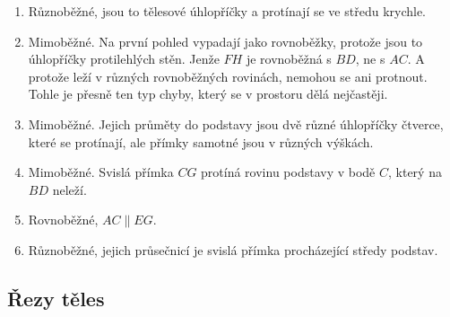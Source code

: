 \begin{solution}
  \begin{enumerate}[label=(\alph*)]
    \item Různoběžné, jsou to tělesové úhlopříčky a protínají se ve středu krychle.
    \item Mimoběžné. Na první pohled vypadají jako rovnoběžky, protože jsou to úhlopříčky protilehlých stěn. Jenže $FH$ je rovnoběžná s $BD$, ne s $AC$. A protože leží v různých rovnoběžných rovinách, nemohou se ani protnout. Tohle je přesně ten typ chyby, který se v prostoru dělá nejčastěji.
    \item Mimoběžné. Jejich průměty do podstavy jsou dvě různé úhlopříčky čtverce, které se protínají, ale přímky samotné jsou v různých výškách.
    \item Mimoběžné. Svislá přímka $CG$ protíná rovinu podstavy v bodě $C$, který na $BD$ neleží.
    \item Rovnoběžné, $AC\parallel EG$.
    \item Různoběžné, jejich průsečnicí je svislá přímka procházející středy podstav.
  \end{enumerate}
  \begin{center}
    \hspace{1cm}
  \end{center}
\end{solution}

\subsection{Řezy těles}\label{sec:rezy-teles}

